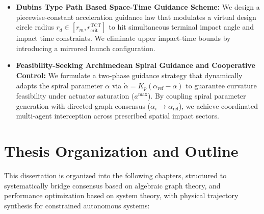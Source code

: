 \begin{itemize}
\begin{itemize}
            \item For two loops/cycles, partial overlap between cycles ($s > 0$) strictly improves $\mathcal{H}_2$ performance, compared to non-overlapping loop configurations.
        \end{itemize}
    \item \textbf{Dubins Type Path Based Space-Time Guidance Scheme:} We design a piecewise-constant acceleration guidance law that modulates a virtual design circle radius $r_d \in [r_m, r_{\text{crit}}^{\text{TCT}}]$ to hit simultaneous terminal impact angle and impact time constraints. We eliminate upper impact-time bounds by introducing a mirrored launch configuration. 
    \item \textbf{Feasibility-Seeking Archimedean Spiral Guidance and Cooperative Control:} We formulate a two-phase guidance strategy that dynamically adapts the spiral parameter $\alpha$ via $\dot{\alpha} = K_p(\alpha_{\text{ref}} - \alpha)$ to guarantee curvature feasibility under actuator saturation ($a^{\text{max}}$). By coupling spiral parameter generation with directed graph consensus ($\alpha_i \to \alpha_{\text{ref}}$), we achieve coordinated multi-agent interception across prescribed spatial impact sectors.
\end{itemize}

\section{Thesis Organization and Outline}\label{sec:thesis_organization}

This dissertation is organized into the following chapters, structured to systematically bridge consensus based on algebraic graph theory, and performance optimization based on system theory, with physical trajectory synthesis for constrained autonomous systems:

